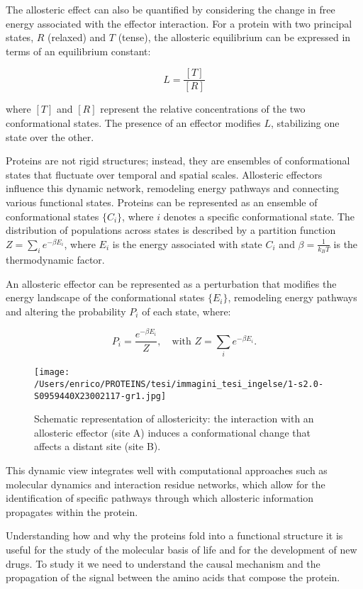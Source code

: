 \documentclass[English, Lau, oneside]{sapthesis}
\begin{document}
The allosteric effect can also be quantified by considering the change in free energy associated with the effector interaction. For a protein with two principal states, \(R\) (relaxed) and \(T\) (tense), the allosteric equilibrium can be expressed in terms of an equilibrium constant:\cite{ref6}

\[
L = \frac{[T]}{[R]}
\]

where \([T]\) and \([R]\) represent the relative concentrations of the two conformational states. The presence of an effector modifies \(L\), stabilizing one state over the other.



Proteins are not rigid structures; instead, they are ensembles of conformational states that fluctuate over temporal and spatial scales. Allosteric effectors influence this dynamic network, remodeling energy pathways and connecting various functional states. Proteins can be represented as an ensemble of conformational states \(\{C_i\}\), where \(i\) denotes a specific conformational state. The distribution of populations across states is described by a partition function \(Z = \sum_i e^{-\beta E_i}\), where \(E_i\) is the energy associated with state \(C_i\) and \(\beta = \frac{1}{k_B T}\) is the thermodynamic factor.

An allosteric effector can be represented as a perturbation that modifies the energy landscape of the conformational states \(\{E_i\}\), remodeling energy pathways and altering the probability \(P_i\) of each state, where:\cite{ref6}

\[
P_i = \frac{e^{-\beta E_i}}{Z}, \quad \text{with } Z = \sum_i e^{-\beta E_i}.
\]

\begin{figure}[h]
    \centering
    \texttt{[image: /Users/enrico/PROTEINS/tesi/immagini\_tesi\_ingelse/1-s2.0-S0959440X23002117-gr1.jpg]}
    \caption{Schematic representation of allostericity: the interaction with an allosteric effector (site A) induces a conformational change that affects a distant site (site B).}
    \label{fig:allostericity_dynamics}
\end{figure}

This dynamic view integrates well with computational approaches such as molecular dynamics and interaction residue networks, which allow for the identification of specific pathways through which allosteric information propagates within the protein.

Understanding how and why the proteins fold into a functional structure it is useful for the study of the molecular basis of life and for the development of new drugs.
To study it we need to understand the causal mechanism and the propagation of the signal between the amino acids that compose the protein.
\end{document}
